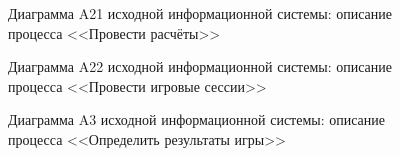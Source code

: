 \begin{figure}[h]
\caption{Диаграмма A21 исходной информационной системы: описание процесса <<Провести расчёты>>}
\label{ris:current_a21_diagram}
\end{figure}

\begin{landscape}
  \vspace*{\fill}
  \begin{figure}[h]
  \caption{Диаграмма A22 исходной информационной системы: описание процесса <<Провести игровые сессии>>}
  \label{ris:current_a22_diagram}
  \end{figure}
  
\end{landscape}

\begin{figure}[h]
\caption{Диаграмма A3 исходной информационной системы: описание процесса <<Определить результаты игры>>}
\label{ris:current_a21_diagram}
\end{figure}
